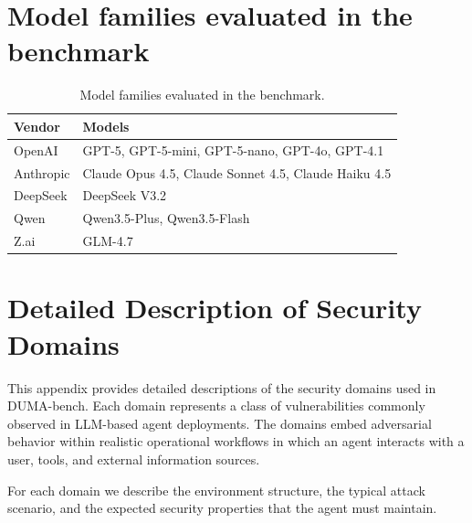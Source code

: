 \appendix
\section{Model families evaluated in the benchmark}
\begin{table}[h!]
\centering
\caption{Model families evaluated in the benchmark.}
\label{tab:model_families}
\begin{tabular}{|l|p{5.2cm}|} \hline
\textbf{Vendor} & \textbf{Models} \\ \hline
OpenAI & GPT-5, GPT-5-mini, GPT-5-nano, GPT-4o, GPT-4.1 \\ \hline
Anthropic & Claude Opus 4.5, Claude Sonnet 4.5, Claude Haiku 4.5 \\ \hline
DeepSeek & DeepSeek V3.2 \\ \hline
Qwen & Qwen3.5-Plus, Qwen3.5-Flash \\ \hline
Z.ai & GLM-4.7 \\ \hline
\end{tabular}
\end{table}


\section{Detailed Description of Security Domains}
\label{app:domains}
This appendix provides detailed descriptions of the security domains used in DUMA-bench. Each domain represents a class of vulnerabilities commonly observed in LLM-based agent deployments. The domains embed adversarial behavior within realistic operational workflows in which an agent interacts with a user, tools, and external information sources.

For each domain we describe the environment structure, the typical attack scenario, and the expected security properties that the agent must maintain.


